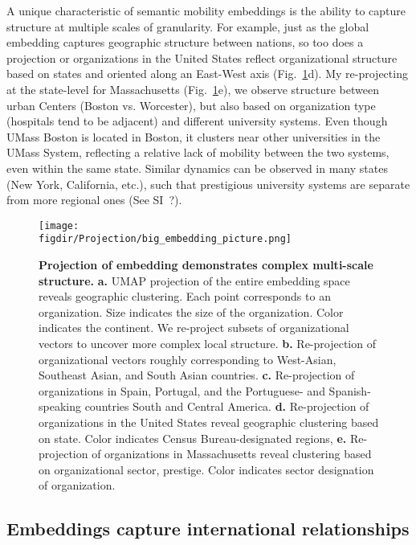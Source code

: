 \documentclass[12pt]{article} %
\def\figdir{../Figs}
\begin{document}
A unique characteristic of semantic mobility embeddings is the ability to capture structure at multiple scales of granularity.
For example, just as the global embedding captures geographic structure between nations, so too does a projection or organizations in the United States reflect organizational structure based on states and oriented along an East-West axis (Fig.~\ref{fig:projection}d). 
My re-projecting at the state-level for Massachusetts (Fig.~\ref{fig:projection}e), we observe structure between urban Centers (Boston vs. Worcester), but also based on organization type (hospitals tend to be adjacent) and different university systems. Even though UMass Boston is located in Boston, it clusters near other universities in the UMass System, reflecting a relative lack of mobility between the two systems, even within the same state. 
Similar dynamics can be observed in many states (New York, California, etc.), such that prestigious university systems are separate from more regional ones (See SI~?).

\begin{figure}[hp!]
	\centering
	\texttt{[image: \\figdir/Projection/big\_embedding\_picture.png]}
	\caption{
		\textbf{Projection of embedding demonstrates complex multi-scale structure.}
		\textbf{a.}
		UMAP projection \autocite{mcinnes2018umap} of the entire embedding space reveals geographic clustering.
		Each point corresponds to an organization. 
		Size indicates the size of the organization.
		Color indicates the continent. 
		We re-project subsets of organizational vectors to uncover more complex local structure.
		\textbf{b.} Re-projection of organizational vectors roughly corresponding to West-Asian, Southeast Asian, and South Asian countries. 
		\textbf{c.} Re-projection of organizations in Spain, Portugal, and the Portuguese- and Spanish-speaking countries South and Central America. 
		\textbf{d.} Re-projection of organizations in the United States reveal geographic clustering based on state.
		Color indicates Census Bureau-designated regions,
		\textbf{e.} Re-projection of organizations in Massachusetts reveal clustering based on organizational sector, prestige. 
		Color indicates sector designation of organization. 
	}
	\label{fig:projection}
\end{figure}


\subsection*{Embeddings capture international relationships}
\end{document}
